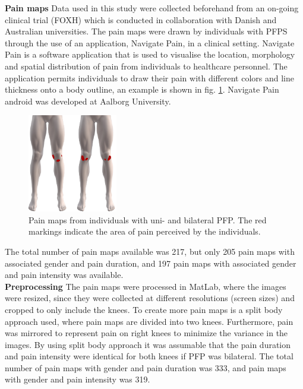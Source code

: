 \textbf{Pain maps} \newline
Data used in this study were collected beforehand from an on-going clinical trial (FOXH) which is conducted in collaboration with Danish and Australian universities. The pain maps were drawn by individuals with PFPS through the use of an application, Navigate Pain, in a clinical setting. \newline
\noindent
Navigate Pain is a software application that is used to visualise the location, morphology and spatial distribution of pain from individuals to healthcare personnel. The application permits individuals to draw their pain with different colors and line thickness onto a body outline, an example is shown in fig. \ref{fig:twoPainmaps}. Navigate Pain android was developed at Aalborg University.\citep{Solutions2015}

\begin{figure}[H]
\centering
\includegraphics[width=0.35\textwidth]{Figures/twoPainmaps}
\caption{Pain maps from individuals with uni- and bilateral PFP. The red markings indicate the area of pain perceived by the individuals.}
\label{fig:twoPainmaps}
\end{figure}

\noindent
The total number of pain maps available was 217, but only 205 pain maps with associated gender and pain duration, and 197 pain maps with associated gender and pain intensity was available.\\

\noindent
\textbf{Preprocessing} \newline
\noindent
The pain maps were processed in MatLab, where the images were resized, since they were collected at different resolutions (screen sizes) and cropped to only include the knees. To create more pain maps is a split body approach used, where pain maps are divided into two knees. Furthermore, pain was mirrored to represent pain on right knees to minimize the variance in the images. By using split body approach it was assumable that the pain duration and pain intensity were identical for both knees if PFP was bilateral. The total number of pain maps with gender and pain duration was 333, and pain maps with gender and pain intensity was 319. \\

